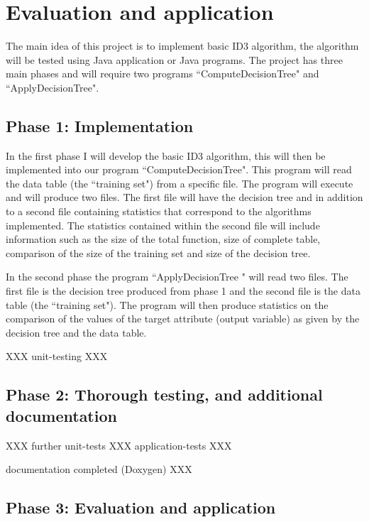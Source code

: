 \documentclass{report}
\begin{document}
\section{Evaluation and application}
\label{sec:eval}

The main idea of this project is to implement basic ID3 algorithm, the algorithm will be tested using Java application or Java programs. The project has three main phases and will require two programs ``ComputeDecisionTree" and ``ApplyDecisionTree". 


\subsection{Phase 1: Implementation}
\label{sec:phase1}

In the first phase I will develop the basic ID3 algorithm, this will then be implemented into our program ``ComputeDecisionTree". This program will read the data table (the ``training set") from a specific file. The program will execute and will produce two files. The first file will have the decision tree and in addition to a second file containing statistics that correspond to the algorithms implemented. The statistics contained within the second file will 
include information such as the size of the total function, size of complete table, comparison of the size of the training set and size of the decision tree.

In the second phase the program ``ApplyDecisionTree " will read two files. The first file is the decision tree produced from phase 1 and the second file is the data table (the ``training set"). The program will then produce statistics on the comparison of the values of the target attribute (output variable) as given by the decision tree and the data table.

XXX unit-testing XXX


\subsection{Phase 2: Thorough testing, and additional documentation}
\label{sec:phase2}

XXX further unit-tests XXX application-tests XXX

documentation completed (Doxygen) XXX


\subsection{Phase 3: Evaluation and application}
\label{sec:phase3}
\end{document}

